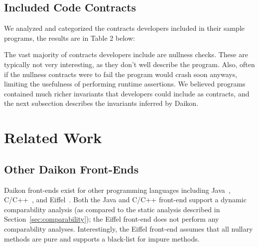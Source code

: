 \documentclass{article}
\begin{document}


\label{sec:survey}
\subsection{Included Code Contracts}
We analyzed and categorized the contracts developers included in their sample programs, the results are in Table 2 below:

\begin{center}{\small }
\end{center}
\label{table:cc-usage}
The vast majority of contracts developers include are nullness checks. These are typically not very interesting, as they don't well describe the program. Also, often if the nullness contracts were to fail the program would crash soon anyways, limiting the usefulness of performing runtime assertions. We believed programs contained much richer invariants that developers could include as contracts, and the next subsection describes the invariants inferred by Daikon.



\section{Related Work}

\subsection{Other Daikon Front-Ends}

Daikon front-ends exist
for other programming languages including Java~\cite{ErnstPGMPTX2007},
C/C++~\cite{Guo2006,Rudd2010}, and Eiffel~\cite{Polikarpova2009}. Both
the Java and C/C++ front-end support a dynamic comparability analysis
(as compared to the static analysis described in
Section~\ref{sec:comparability}); the Eiffel front-end does not
perform any comparability analyses.
%
Interestingly, the Eiffel front-end assumes that all nullary methods
are pure and supports a black-list for impure methods.
\end{document}
